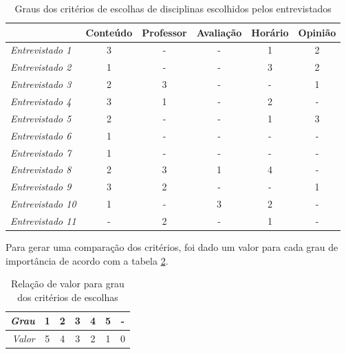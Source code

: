 \begin{table}[!ht]
    \begin{center}
        \begin{tabular}{ l|c|c|c|c|c } 
            & Conteúdo & Professor & Avaliação & Horário & Opinião \\ 
            \hline 
            \textit{Entrevistado 1 } & 3 & - & - & 1 & 2 \\     %
            \textit{Entrevistado 2 } & 1 & - & - & 3 & 2 \\     %
            \textit{Entrevistado 3 } & 2 & 3 & - & - & 1 \\     %
            \textit{Entrevistado 4 } & 3 & 1 & - & 2 & - \\     %
            \textit{Entrevistado 5 } & 2 & - & - & 1 & 3 \\     %
            \textit{Entrevistado 6 } & 1 & - & - & - & - \\     %
            \textit{Entrevistado 7 } & 1 & - & - & - & - \\     %
            \textit{Entrevistado 8 } & 2 & 3 & 1 & 4 & - \\     %
            \textit{Entrevistado 9 } & 3 & 2 & - & - & 1 \\     %
            \textit{Entrevistado 10} & 1 & - & 3 & 2 & - \\     %
            \textit{Entrevistado 11} & - & 2 & - & 1 & - \\     %
        \end{tabular}
    \end{center}
    \caption{Graus dos critérios de escolhas de disciplinas escolhidos pelos 
    entrevistados}
    
    \label{tab:entrevista-criterios-raw}
\end{table}

Para gerar uma comparação dos critérios, foi dado um valor para cada grau de importância de acordo com a tabela \ref{tab:grau-valor}.

\begin{table}[!ht]
    \begin{center}
        \begin{tabular}{ r||c|c|c|c|c|c } 
            \textit{Grau} & 1 & 2 & 3 & 4 & 5 & - \\
            \hline 
            \textit{Valor} & 5 & 4 & 3 & 2 & 1 & 0 \\
        \end{tabular}
    \end{center}
    \caption{Relação de valor para grau dos critérios de escolhas}
    \label{tab:grau-valor}
\end{table}


